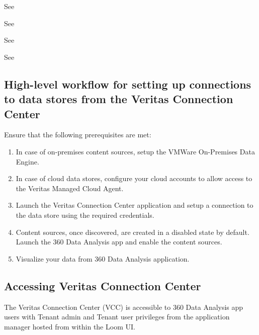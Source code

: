 \documentclass[letterpaper,10pt,english]{sphinxmanual}
\begin{document}
See {\hyperref[\detokenize{mcdmp_app_ug:prereq-google-cloud-storage}]{}}

See {\hyperref[\detokenize{mcdmp_app_ug:prerequisites-azure}]{}}

See {\hyperref[\detokenize{mcdmp_app_ug:prereq-nfs}]{}}

See {\hyperref[\detokenize{mcdmp_app_ug:prereq-sharepoint-onpremises}]{}}


\subsection{High-level workflow for setting up connections to data stores from the Veritas Connection Center}
\label{\detokenize{mcdmp_app_ug:high-level-workflow-for-setting-up-connections-to-data-stores-from-the-veritas-connection-center}}
Ensure that the following prerequisites are met:
\begin{enumerate}
\item {} 
In case of on-premises content sources, setup the VMWare On-Premises Data Engine.

\item {} 
In case of cloud data stores, configure your cloud accounts to allow access to the Veritas Managed Cloud Agent.

\item {} 
Launch the Veritas Connection Center application and setup a connection to the data store using the required credentials.

\item {} 
Content sources, once discovered, are created in a disabled state by default. Launch the 360 Data Analysis app and enable the content sources.

\item {} 
Visualize your data from 360 Data Analysis application.

\end{enumerate}


\subsection{Accessing Veritas Connection Center}
\label{\detokenize{mcdmp_app_ug:accessing-veritas-connection-center}}
The Veritas Connection Center (VCC) is accessible to 360 Data Analysis app users with Tenant admin and Tenant user privileges from the application manager hosted from within the Loom UI.
\end{document}
